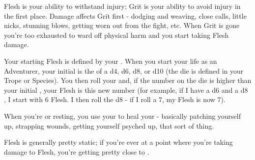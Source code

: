 {  





Flesh is your ability to withstand injury; Grit is your ability to avoid injury in the first place.  Damage affects Grit first - dodging and weaving, close calls, little nicks, stunning blows, getting worn out from the fight, etc. When Grit is gone you're too exhausted to ward off physical harm and you start taking Flesh damage.

Your starting Flesh is defined by your \FLESH.  When you start your life as an Adventurer, your initial \FLESH is the \MAX of a d4, d6, d8, or d10 (the die is defined in your Trope or Species). You then roll your \VIG and, if the number on the die is higher than your initial \FLESH, your \MAX Flesh is this new number (for example, if I have a d6 \FLESH and a d8 \VIG, I start with 6 Flesh.  I then roll the d8 - if I roll a 7, my \MAX Flesh is now 7).

When you're  or resting, you use your \FLESH to heal your  - basically patching yourself up, strapping wounds, getting yourself psyched up, that sort of thing.  

Flesh is generally pretty static; if you're ever at a point where you're taking damage to Flesh, you're getting pretty close to .

}

